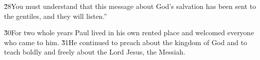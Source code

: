 \v{28}You must understand that this message about God's salvation has been sent to the gentiles, and they will listen.''

\v{30}For two whole years Paul lived in his own rented place and welcomed everyone who came to him. \v{31}He continued to preach about the kingdom of God and to teach boldly and freely about the Lord Jesus, the Messiah.
